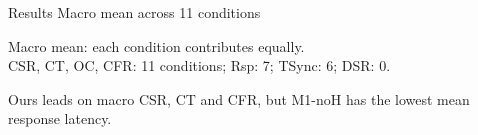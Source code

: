 \documentclass[11pt]{beamer}
\begin{document}
\begin{frame}{Results \hfill Macro mean across 11 conditions}
\centering\vspace{.09cm}
\vspace{.33cm}
\begin{center}\small
Macro mean: each condition contributes equally.\\[6pt]
\scriptsize CSR, CT, OC, CFR: 11 conditions; Rsp: 7; TSync: 6; DSR: 0.
\end{center}
\vspace{.10cm}
\begin{center}\small
Ours leads on macro CSR, CT and CFR, but M1-noH has the lowest mean response latency.
\end{center}
\end{frame}
\end{document}
